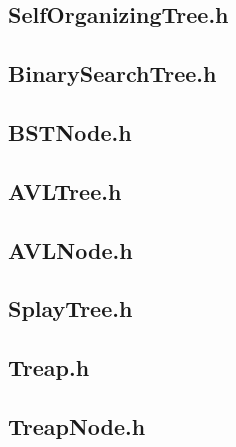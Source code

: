 \documentclass[a4paper,10pt]{article}
\begin{document}
\subsection{SelfOrganizingTree.h}

\subsection{BinarySearchTree.h}

\subsection{BSTNode.h}

\subsection{AVLTree.h}

\subsection{AVLNode.h}

\subsection{SplayTree.h}

\subsection{Treap.h}

\subsection{TreapNode.h}

\end{document}
